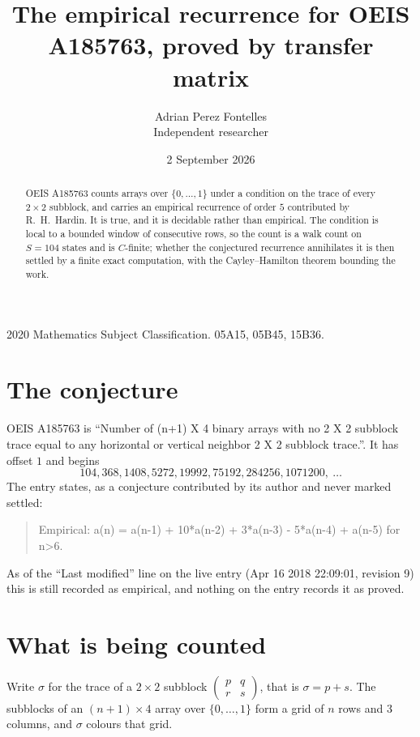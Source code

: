 \documentclass[11pt,a4paper]{article}
\title{The empirical recurrence for OEIS A185763, proved by transfer matrix}
\author{Adrian Perez Fontelles\\ \small Independent researcher}
\date{2 September 2026}
\theoremstyle{plain}
\theoremstyle{definition}
\begin{document}
\maketitle

\begin{abstract}
OEIS A185763 counts arrays over $\{0,\dots,1\}$ under a condition on the trace of every
$2\times2$ subblock, and carries an empirical recurrence of order $5$ contributed by
R.~H.~Hardin. It is true, and it is decidable rather than empirical. The condition is local to
a bounded window of consecutive rows, so the count is a walk count on $S=104$ states and is
$C$-finite; whether the conjectured recurrence annihilates it is then settled by a finite exact
computation, with the Cayley--Hamilton theorem bounding the work.
\end{abstract}

\noindent\small 2020 Mathematics Subject Classification. 05A15, 05B45, 15B36.\normalsize

\section{The conjecture}

OEIS A185763 is ``Number of (n+1) X 4 binary arrays with no 2 X 2 subblock trace equal to any horizontal or vertical neighbor 2 X 2 subblock trace.''. It has offset $1$ and begins
\[
104, 368, 1408, 5272, 19992, 75192, 284256, 1071200,\ \dots
\]
The entry states, as a conjecture contributed by its author and never marked settled:
\begin{quote}
Empirical: a(n) = a(n-1) + 10*a(n-2) + 3*a(n-3) - 5*a(n-4) + a(n-5) for n>6.
\end{quote}
As of the ``Last modified'' line on the live entry (Apr 16 2018 22:09:01, revision 9) this is still
recorded as empirical, and nothing on the entry records it as proved.

\section{What is being counted}

Write $\sigma$ for the trace of a $2\times2$ subblock
$\begin{pmatrix}p&q\\r&s\end{pmatrix}$, that is $\sigma=p+s$. The subblocks of an
$(n+1)\times4$ array over $\{0,\dots,1\}$ form a grid of $n$ rows and $3$
columns, and $\sigma$ colours that grid.
\end{document}
